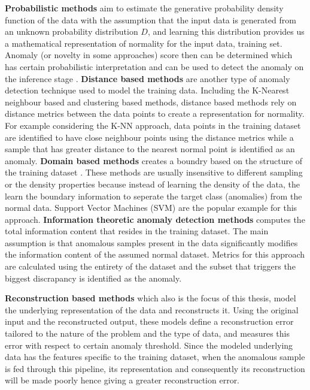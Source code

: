 {\textbf{Probabilistic methods} aim to estimate the generative probability density function of the data
with the assumption that the input data is generated from an unknown probability distribution $D$,
and learning this distribution provides us a mathematical representation of normality for the input
data, training set. Anomaly (or novelty in some approaches) score then can be determined which has
certain probabilistic interpretation and can be used to detect the anomaly on the inference stage
\cite{Pimentel:2014:RRN:2588908.2589196}. \textbf{Distance based methods} are another type of 
anomaly detection technique used to model the training data.
Including the K-Nearest neighbour based and clustering based methods, distance based methods rely on
distance metrics between the data points to create a representation for normality. For example
considering the K-NN approach, data points in the training dataset are identified to have close
neighbour points using the distance metrics while a sample that has greater distance to the
nearest normal point is identified as an anomaly. \textbf{Domain based methods} creates a 
boundry based on the structure of the training dataset \cite{Pimentel:2014:RRN:2588908.2589196}.
These methods are usually insensitive to
different sampling or the density properties because instead of learning the density of
the data, the learn the boundary information to seperate the target class (anomalies) from the
normal data. Support Vector Machines (SVM) are the popular example for this approach. \textbf{Information
theoretic anomaly detection methods} computes the total information content that resides in the
training dataset. The main assumption is that anomalous samples present in the data significantly
modifies the information content of the assumed normal dataset. Metrics for this approach are
calculated using the entirety of the dataset and the subset that triggers the biggest discrapancy is
identified as the anomaly. 

\textbf{Reconstruction based methods} which also is the focus of this thesis, model the underlying
representation of the data and reconstructs it. Using the original input and the reconstructed
output, these models define a reconstruction error tailored to the nature of the problem and the
type of data, and measures this error with respect to certain anomaly threshold. Since the modeled
underlying data has the features specific to the training dataset, when the anomalous sample is
fed through this pipeline, its representation and consequently its reconstruction will be made
poorly hence giving a greater reconstruction error. 

}
